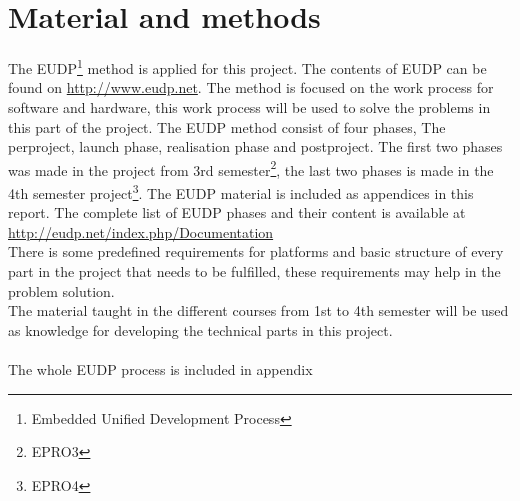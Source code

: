 \chapter{Material and methods}
The EUDP\footnote{Embedded Unified Development Process} method is applied for this project. The contents of EUDP can be found on \url{http://www.eudp.net}. The method is focused on the work process for software and hardware, this work process will be used to solve the problems in this part of the project. The EUDP method consist of four phases, The perproject, launch phase, realisation phase and postproject. The first two phases was made in the project from 3rd semester\footnote{EPRO3}, the last two phases is made in the 4th semester project\footnote{EPRO4}. The EUDP material is included as appendices in this report. The complete list of EUDP phases and their content is available at \url{http://eudp.net/index.php/Documentation}\\
There is some predefined requirements for platforms and basic structure of every part in the project that needs to be fulfilled, these requirements may help in the problem solution.\\
The material taught in the different courses from 1st to 4th semester will be used as knowledge for developing the technical parts in this project.\\
\\
The whole EUDP process is included in appendix
